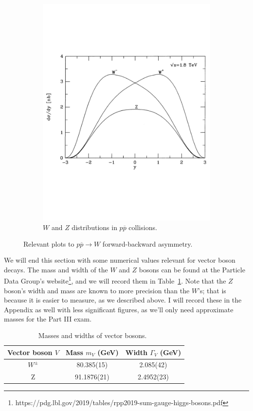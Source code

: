 \documentclass[11pt, oneside]{article}   	%
\theoremstyle{definition}
\numberwithin{equation}{subsection}		%
\begin{document}
\begin{figure}[H]
\begin{subfigure}[t]{.45\textwidth}
		\includegraphics[width = \textwidth]{fb_asymmetry}
		\caption{$W$ and $Z$ distributions in $p\overline p$ collisions.}
		\label{subfig:fb_asymmetry}
	\end{subfigure}
	\caption{Relevant plots to $p\overline p\rightarrow W$ forward-backward asymmetry.~\cite{ellis}}
\end{figure}

We will end this section with some numerical values relevant for vector boson decays. The mass and width of the $W$ and $Z$ bosons 
can be found at the Particle Data Group's website\footnote{https://pdg.lbl.gov/2019/tables/rpp2019-sum-gauge-higgs-bosons.pdf}, and 
we will record them in Table~\ref{table:vector_boson_params}. Note that the $Z$ boson's width and mass are known to more precision 
than the $W$'s; that is because it is easier to measure, as we described above. I will record these in the Appendix as well with less 
significant figures, as we'll only need approximate masses for the Part III exam.
\begin{table}[H]
	\centering
	\begin{tabular}{ | c | c | c | }
		\hline
		Vector boson $V$ & Mass $m_V$ (GeV) & Width $\Gamma_V$ (GeV) \\
		\hline
		$W^\pm$ & 80.385(15) & 2.085(42) \\
		\hline
		Z & 91.1876(21) & 2.4952(23) \\
		\hline
	\end{tabular}
	\caption{Masses and widths of vector bosons.~\cite{pdg}}
	\label{table:vector_boson_params}
\end{table}
\end{document}
